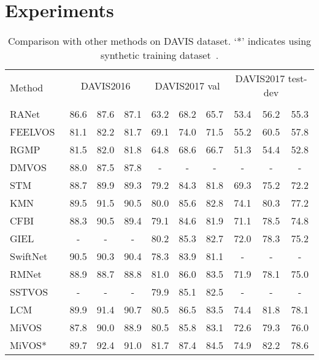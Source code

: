 \documentclass[runningheads]{llncs}
\begin{document}
%
 \section{Experiments}
\begin{table*}[t]
\centering
		\caption{Comparison with other methods on DAVIS dataset. `*' indicates using synthetic training dataset~\cite{mivos}.}
\label{tab:results}
		\setlength\tabcolsep{4pt}
		\begin{tabular}{lccccccccc}
			\toprule[1.5pt]
			\multirow{2}{*}{Method} & \multicolumn{3}{c}{DAVIS2016} & \multicolumn{3}{c}{DAVIS2017 val} & \multicolumn{3}{c}{DAVIS2017 test-dev} \\
			\cmidrule(lr){2-4} \cmidrule(lr){5-7} \cmidrule(lr){8-10}
			&  &  &  &  &  & &  & &  \\
			\midrule
RANet~\cite{ranet}   & 86.6 & 87.6 & 87.1 & 63.2  & 68.2 & 65.7 & 53.4    & 56.2    & 55.3 \\
			FEELVOS~\cite{feelvos}  & 81.1 & 82.2 & 81.7 & 69.1   & 74.0   & 71.5 & 55.2    & 60.5    & 57.8\\
			RGMP~\cite{rgmp}      & 81.5   & 82.0 & 81.8 &64.8 &68.6 &66.7 &51.3 &54.4 &52.8\\
			DMVOS~\cite{dmvos}   & 88.0  & 87.5  & 87.8 &- &- &- &- &- &-\\
			STM~\cite{stm}       & 88.7  & 89.9  & 89.3 & 79.2   & 84.3   & 81.8 & 69.3    & 75.2    & 72.2\\
			KMN~\cite{kmn}       & 89.5  & 91.5 & 90.5 & 80.0    & 85.6    & 82.8 & 74.1    & 80.3    & 77.2\\
			CFBI~\cite{cfbi}     & 88.3  & 90.5  & 89.4 & 79.1    & 84.6    & 81.9 & 71.1    & 78.5    & 74.8\\
GIEL~\cite{giel}     &- &- &- & 80.2    & 85.3    & 82.7 & 72.0    & 78.3    & 75.2\\
			SwiftNet~\cite{swiftnet} & 90.5  & 90.3  & 90.4 & 78.3    & 83.9    & 81.1 &- &- &-\\
			RMNet~\cite{rmnet}   & 88.9  & 88.7 & 88.8 & 81.0    & 86.0    & 83.5 & 71.9    & 78.1    & 75.0\\
			SSTVOS~\cite{sstvos}     &- &- &-  & 79.9  & 85.1  & 82.5   &- &- &- \\ 
			LCM~\cite{lcm}       & 89.9  & 91.4  & 90.7 & 80.5    & 86.5    & 83.5 & 74.4    & 81.8    & 78.1\\
			MiVOS~\cite{mivos}   & {87.8}   & {90.0}  & {88.9} & {80.5}    & {85.8}    & {83.1} &{72.6}    & {79.3}    & {76.0}\\
			MiVOS*~\cite{mivos}  & {89.7}  & {92.4} & {91.0} & {81.7} & {87.4} & {84.5} & {74.9} & {82.2} & {78.6}\\

\end{tabular}
\end{table*}
\end{document}
